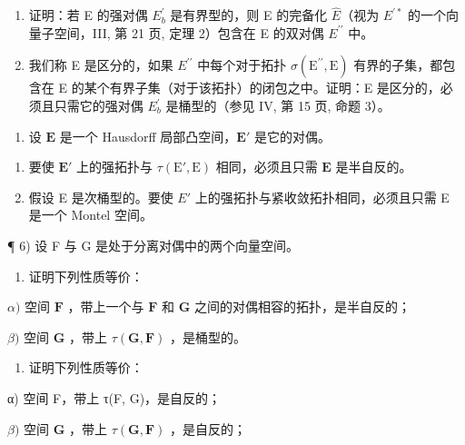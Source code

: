 \begin{enumerate}
\def\labelenumi{\alph{enumi})}
\tightlist
\item
  证明：若 E 的强对偶 \(E_{b}^{\prime}\) 是有界型的，则 E 的完备化 \(\hat{E}\)（视为 \(E^{\prime*}\) 的一个向量子空间，III, 第 21 页, 定理 2）包含在 E 的双对偶 \(E^{\prime\prime}\) 中。
\item
  我们称 E 是区分的，如果 \(E^{\prime\prime}\) 中每个对于拓扑 \(\sigma(\mathrm{E}^{\prime\prime}, \mathrm{E})\) 有界的子集，都包含在 E 的某个有界子集（对于该拓扑）的闭包之中。证明：E 是区分的，必须且只需它的强对偶 \(E_{b}^{\prime}\) 是桶型的（参见 IV, 第 15 页, 命题 3）。
\end{enumerate}

\begin{enumerate}
\def\labelenumi{\arabic{enumi})}
\setcounter{enumi}{4}
\tightlist
\item
  设 \(\mathbf{E}\) 是一个 Hausdorff 局部凸空间，\(\mathbf{E}'\) 是它的对偶。
\end{enumerate}

\begin{enumerate}
\def\labelenumi{\alph{enumi})}
\item
  要使 \(\mathbf{E}'\) 上的强拓扑与 \(\tau (\mathrm{E}',\mathrm{E})\) 相同，必须且只需 \(\mathbf{E}\) 是半自反的。
\item
  假设 E 是次桶型的。要使 \(E'\) 上的强拓扑与紧收敛拓扑相同，必须且只需 E 是一个 Montel 空间。
\end{enumerate}

¶ 6) 设 F 与 G 是处于分离对偶中的两个向量空间。

\begin{enumerate}
\def\labelenumi{\alph{enumi})}
\tightlist
\item
  证明下列性质等价：
\end{enumerate}

\(\alpha)\) 空间 \(\mathbf{F}\) ，带上一个与 \(\mathbf{F}\) 和 \(\mathbf{G}\) 之间的对偶相容的拓扑，是半自反的；

\(\beta)\) 空间 \(\mathbf{G}\) ，带上 \(\tau (\mathbf{G},\mathbf{F})\) ，是桶型的。

\begin{enumerate}
\def\labelenumi{\alph{enumi})}
\setcounter{enumi}{1}
\tightlist
\item
  证明下列性质等价：
\end{enumerate}

α) 空间 F，带上 τ(F, G)，是自反的；

\(\beta)\) 空间 \(\mathbf{G}\) ，带上 \(\tau (\mathbf{G},\mathbf{F})\) ，是自反的；

